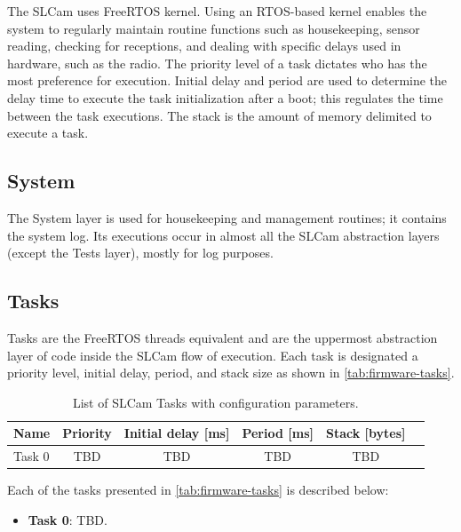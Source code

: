 The SLCam uses FreeRTOS kernel. Using an RTOS-based kernel enables the system to regularly maintain routine functions such as housekeeping, sensor reading, checking for receptions, and dealing with specific delays used in hardware, such as the radio. The priority level of a task dictates who has the most preference for execution. Initial delay and period are used to determine the delay time to execute the task initialization after a boot; this regulates the time between the task executions. The stack is the amount of memory delimited to execute a task.

\subsection{System}

The System layer is used for housekeeping and management routines; it contains the system log. Its executions occur in almost all the SLCam abstraction layers (except the Tests layer), mostly for log purposes.

\subsection{Tasks}

Tasks are the FreeRTOS threads equivalent and are the uppermost abstraction layer of code inside the SLCam flow of execution. Each task is designated a priority level, initial delay, period, and stack size as shown in \autoref{tab:firmware-tasks}.

\begin{table}[!ht]
    \centering

    \begin{tabular}{lccccc}
        \toprule[1.5pt]
        \textbf{Name}          & \textbf{Priority} & \textbf{Initial delay [ms]} & \textbf{Period [ms]} & \textbf{Stack [bytes]} \\
        \midrule
         Task 0       & TBD    & TBD    & TBD     & TBD \\

        \bottomrule[1.5pt]
    \end{tabular}
    \caption{List of SLCam Tasks with configuration parameters.}
    \label{tab:firmware-tasks}
\end{table}

Each of the tasks presented in \autoref{tab:firmware-tasks} is described below:

\begin{itemize}
    \item \textbf{Task 0}: TBD.
\end{itemize}

